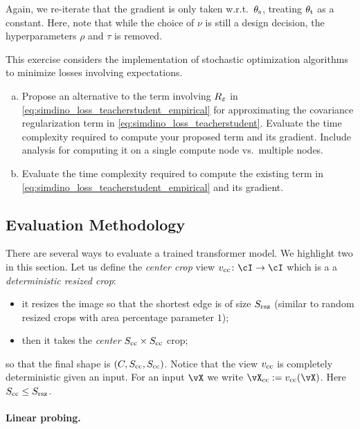 \documentclass[../../book-main.tex]{subfiles}
\begin{document}
Again, we re-iterate that the gradient is only taken w.r.t.~\(\theta_{\mathrm{s}}\), treating \(\theta_{\mathrm{t}}\) as a constant. Here, note that while the choice of \(\nu\) is still a design decision, the hyperparameters \(\rho\) and \(\tau\) is removed.

\begin{exercise}
    This exercise considers the implementation of stochastic optimization algorithms to minimize losses involving expectations.
    \begin{enumerate}[(a)]
        \item Propose an alternative to the term involving \(R_{\varepsilon}\) in \eqref{eq:simdino_loss_teacherstudent_empirical} for approximating the covariance regularization term in \eqref{eq:simdino_loss_teacherstudent}. Evaluate the time complexity required to compute your proposed term and its gradient. Include analysis for computing it on a single compute node vs.~multiple nodes.
        \item  Evaluate the time complexity required to compute the existing term in \eqref{eq:simdino_loss_teacherstudent_empirical} and its gradient.
    \end{enumerate}
\end{exercise}


\subsection{Evaluation Methodology}\label{sub:contrastive_learning_evals}
There are several ways to evaluate a trained transformer model. We highlight two in this section. Let us define the \textit{center crop} view \(v_{\cc} \colon \cI \to \cI\) which is a a \textit{deterministic resized crop}:
\begin{itemize}
    \item it resizes the image so that the shortest edge is of size \(S_{\mathrm{rsz}}\) (similar to random resized crops with area percentage parameter \(1\));
    \item then it takes the \textit{center} \(S_{\mathrm{cc}} \times S_{\mathrm{cc}}\) crop;
\end{itemize}
so that the final shape is \((C, S_{\mathrm{cc}}, S_{\mathrm{cc}})\). Notice that the view \(v_{\mathrm{cc}}\) is completely deterministic given an input. For an input \(\vX\) we write \(\vX_{\cc} := v_{\cc}(\vX)\). Here \(S_{\mathrm{cc}} \leq S_{\mathrm{rsz}}\).


\paragraph{Linear probing.}
\end{document}
